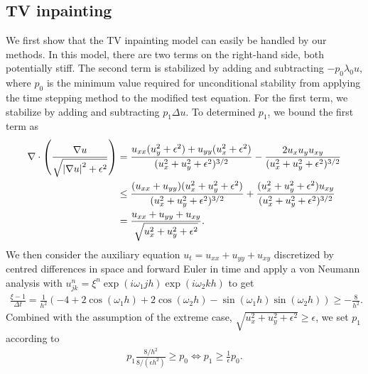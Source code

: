 \subsection{TV inpainting}
We first show that the TV inpainting model can easily be handled by our methods. In this model, there are two terms on the right-hand side, both potentially stiff.  The second term is stabilized by adding and subtracting $-p_0\lambda_0 u$, where $p_0$ is the minimum value required for unconditional stability from applying the time stepping method to the modified test equation. For the first term, we stabilize by adding and subtracting $p_1\Delta u$. To determined $p_1$, we bound the first term as 
\begin{align}
\begin{split}
        \nabla \cdot \left(\frac{\nabla u}{\sqrt{\left|\nabla u\right|^2 + \epsilon^2}} \right) 
&= \frac{u_{xx}(u_y^2 + \epsilon^2) + u_{yy}(u_x^2 + \epsilon^2)}{(u_x^2 + u_y^2 + \epsilon^2)^{3/2}} 
- \frac{2u_xu_y u_{xy}}{(u_x^2 + u_y^2 + \epsilon^2)^{3/2}} 
\\
&\leq \frac{(u_{xx}+u_{yy})(u_x^2 + u_y^2 + \epsilon^2)}{(u_x^2 + u_y^2 + \epsilon^2)^{3/2}} + \frac{(u_x^2 + u_y^2 + \epsilon^2)u_{xy}}{(u_x^2 + u_y^2 + \epsilon^2)^{3/2}}  
\\
&= \frac{u_{xx} + u_{yy} + u_{xy}}{\sqrt{u_x^2 + u_y^2 + \epsilon^2}}.
\end{split}
\label{p1 estimate inpaint 1}
\end{align}
We then consider the auxiliary equation $u_t = u_{xx} + u_{yy} + u_{xy}$ discretized by centred differences in space and forward Euler in time and apply a von Neumann analysis with $u^n_{jk} = \xi^n \exp(i\omega_1jh)\exp(i\omega_2kh)$ to get 
\begin{align}
        \frac{\xi  - 1}{\Delta t} 
= \frac{1}{h^2}(-4 + 2\cos(\omega_1 h) + 2\cos(\omega_2 h) - \sin(\omega_1 h)\sin(\omega_2h))
\geq -\frac{8}{h^2}.
\label{p1 estimate inpaint 2}
\end{align}
Combined with the assumption of the extreme case, $\sqrt{u_x^2 + u_y^2 + \epsilon^2} \geq \epsilon$, we set $p_1$ according to 
\begin{align}
        p_1\frac{8/h^2}{8/(\epsilon h^2)} \geq p_0 \iff 
p_1 \geq \frac{1}{\epsilon}p_0.
\end{align}

